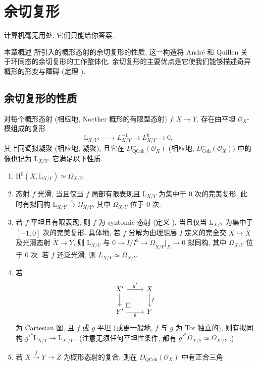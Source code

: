 \section{余切复形}\label{src:C.3}
\begin{epigraph}
计算机毫无用处. 它们只能给你答案.
\end{epigraph}
本章概述 \cite{Ill71} 所引入的概形态射的余切复形的性质, 这一构造将 André \cite{And67} 和 Quillen \cite{Qui68,Qui70} 关于环同态的余切复形的工作整体化. 余切复形的主要优点是它使我们能够描述奇异概形的形变与障碍 (定理 ).
\subsection{余切复形的性质}\label{src:C.3.1-subsection}
\begin{theorem}\label{src:C.3.1}
对每个概形态射 (相应地, Noether 概形的有限型态射) $f:X\to Y$, 存在由平坦 $\mathcal O_X$-模组成的复形
\[
\mathrm L_{X/Y}:\cdots\to L_{X/Y}^{-1}\to L_{X/Y}^0\to0,
\]
其上同调拟凝聚 (相应地, 凝聚), 且它在 $D_{\mathrm{QCoh}}^-(\mathcal O_X)$ (相应地, $D_{\mathrm{Coh}}^-(\mathcal O_X)$) 中的像也记为 $\mathrm L_{X/Y}$. 它满足以下性质.
\begin{enumerate}[(1)]
\item $\mathrm H^0(X,\mathrm L_{X/Y})\simeq\Omega_{X/Y}$.
\item 态射 $f$ 光滑, 当且仅当 $f$ 局部有限表现且 $\mathrm L_{X/Y}$ 为集中于 $0$ 次的完美复形. 此时有拟同构 $\mathrm L_{X/Y}\xrightarrow{\sim}\Omega_{X/Y}$, 其中 $\Omega_{X/Y}$ 位于 $0$ 次.
\item 若 $f$ 平坦且有限表现, 则 $f$ 为 syntomic 态射 (定义 ), 当且仅当 $\mathrm L_{X/Y}$ 为集中于 $[-1,0]$ 次的完美复形. 具体地, 若 $f$ 分解为由理想层 $I$ 定义的完全交 $X\hookrightarrow\widetilde X$ 及光滑态射 $\widetilde X\to Y$, 则 $\mathrm L_{X/Y}$ 与 $0\to I/I^2\to\Omega_{\widetilde X/Y}|_X\to0$ 拟同构, 其中 $\Omega_{X/Y}$ 位于 $0$ 次. 若 $f$ 还泛光滑, 则 $L_{X/Y}\simeq\Omega_{X/Y}$.
\item 若
\[
\begin{tikzcd}
X'\arrow[r,"g'"]\arrow[d]&X\arrow[d,"f"]\\
Y'\arrow[r,"g"']\arrow[ur,phantom,"\square",very near start]&Y
\end{tikzcd}
\]
为 Cartesian 图, 且 $f$ 或 $g$ 平坦 (或更一般地, $f$ 与 $g$ 为 Tor 独立的), 则有拟同构 $g'^*\mathrm L_{X/Y}\to\mathrm L_{X'/Y'}$. (注意无须任何平坦性条件, 都有 $g'^*\Omega_{X/Y}\simeq\Omega_{X'/Y'}$.)
\item 若 $X\xrightarrow{f}Y\to Z$ 为概形态射的复合, 则在 $D_{\mathrm{QCoh}}^-(\mathcal O_X)$ 中有正合三角

\end{enumerate}
\end{theorem}
